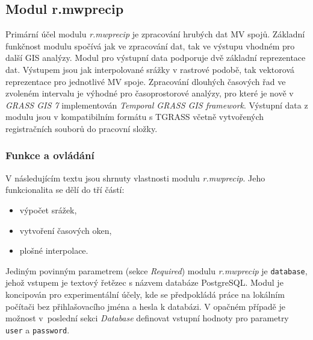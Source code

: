\documentclass[a4paper,12pt,oneside]{report}
\begin{document}
\subsection{Modul r.mwprecip}
Primární účel modulu \textit{r.mwprecip} je zpracování hrubých dat MV
spojů. Základní funkčnost modulu spočívá jak ve zpracování dat, tak ve
výstupu vhodném pro další GIS analýzy. Modul pro výstupní data podporuje dvě
základní reprezentace dat. Výstupem jsou jak interpolované
srážky v rastrové podobě, tak vektorová reprezentace pro jednotlivé MV
spoje.  Zpracování dlouhých časových řad ve zvoleném intervalu je
výhodné pro časoprostorové analýzy, pro které je nově v \textit{GRASS
  GIS 7} implementován \textit{Temporal GRASS GIS framework}. Výstupní
data z modulu jsou v kompatibilním formátu s TGRASS včetně vytvořených
registračních souborů do pracovní složky.

 
\subsubsection{Funkce a ovládání}
V následujícím textu jsou shrnuty vlastnosti modulu
\textit{r.mwprecip}. Jeho funkcionalita se dělí do tří částí:

\begin{itemize}
\item výpočet srážek,
\item vytvoření časových oken,
\item plošné interpolace.
\end{itemize}

Jediným povinným parametrem (sekce \textit{Required}) modulu
\textit{r.mwprecip} je \texttt{database}, jehož vstupem je textový
řetězec s názvem databáze PostgreSQL. Modul je koncipován pro
experimentální účely, kde se předpokládá práce na lokálním počítači
bez přihlašovacího jména a hesla k databázi. V opačném případě je
možnost v~poslední sekci \textit{Database} definovat vstupní hodnoty
pro parametry \texttt{user} a \texttt{password}.
\end{document}
